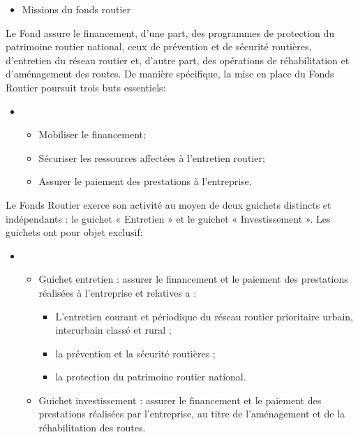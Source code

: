 \begin{itemize}
\item Missions du fonds routier
\end{itemize}
Le Fond assure le financement, d’une part, des programmes de protection du patrimoine routier national, ceux de prévention et de sécurité routières, d’entretien du réseau routier et, d’autre part, des opérations de réhabilitation et d’aménagement des routes. De manière spécifique, la mise en place du Fonds Routier poursuit trois buts essentiels:
\begin{itemize}
\item[] 
\begin{itemize}
\item Mobiliser le financement; 
\item Sécuriser les ressources affectées à l’entretien routier;
\item Assurer le paiement des prestations à l’entreprise.
\end{itemize}
\end{itemize}
Le Fonds Routier exerce son activité au moyen de deux guichets distincts et indépendants : le guichet « Entretien » et le guichet « Investissement ».
Les guichets ont pour objet exclusif:
\begin{itemize}
\item[] 
\begin{itemize}
\item Guichet entretien : assurer le financement et le paiement des prestations réalisées à l’entreprise et relatives a : 
\begin{itemize}
\item L’entretien courant et périodique du réseau routier prioritaire urbain, interurbain classé et rural ;
\item la prévention et la sécurité routières ;
\item la protection du patrimoine routier national.
\end{itemize}
\item Guichet investissement : assurer le financement et le paiement des prestations réalisées par l’entreprise, au titre de l’aménagement et de la réhabilitation des routes.
\end{itemize}
\end{itemize}





